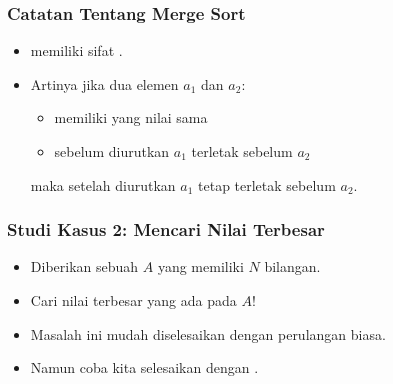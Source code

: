 \begin{frame}
\frametitle{Catatan Tentang Merge Sort}
\begin{itemize}
  \item \fMergeSort memiliki sifat .
  \item Artinya jika dua elemen $a_1$ dan $a_2$:
  \begin{itemize}
    \item memiliki yang nilai sama
    \item sebelum diurutkan $a_1$ terletak sebelum $a_2$
  \end{itemize}
  maka setelah diurutkan $a_1$ tetap terletak sebelum $a_2$.
\end{itemize}
\end{frame}

%
%
%
%

\begin{frame}
\frametitle{Studi Kasus 2: Mencari Nilai Terbesar}
\begin{itemize}
  \item Diberikan sebuah \farray $A$ yang memiliki $N$ bilangan.
  \item Cari nilai terbesar yang ada pada $A$!\newline
  \item Masalah ini mudah diselesaikan dengan perulangan biasa.
  \item Namun coba kita selesaikan dengan \fDivideAndConquer.\end{itemize}
\end{frame}

